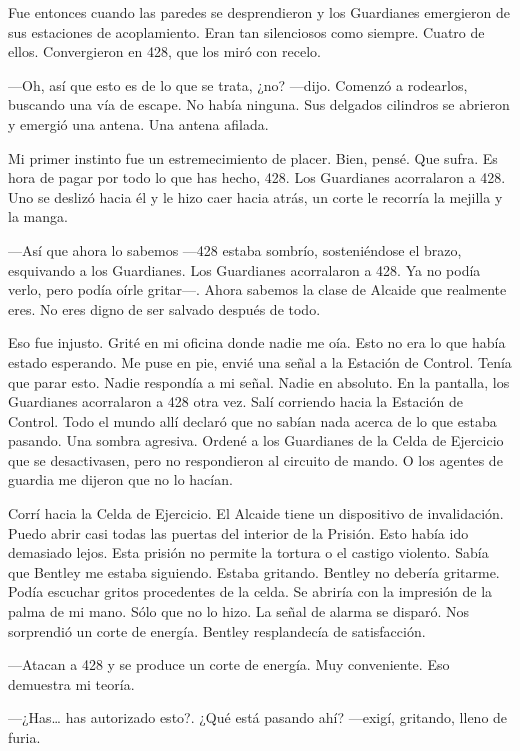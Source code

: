 Fue entonces cuando las paredes se desprendieron y los Guardianes
emergieron de sus estaciones de acoplamiento. Eran tan silenciosos como
siempre. Cuatro de ellos. Convergieron en 428, que los miró con recelo.

---Oh, así que esto es de lo que se trata, ¿no? ---dijo. Comenzó a
rodearlos, buscando una vía de escape. No había ninguna. Sus delgados
cilindros se abrieron y emergió una antena. Una antena afilada.

Mi primer instinto fue un estremecimiento de placer. Bien, pensé. Que
sufra. Es hora de pagar por todo lo que has hecho, 428. Los Guardianes
acorralaron a 428. Uno se deslizó hacia él y le hizo caer hacia atrás,
un corte le recorría la mejilla y la manga.

---Así que ahora lo sabemos ---428 estaba sombrío, sosteniéndose el
brazo, esquivando a los Guardianes. Los Guardianes acorralaron a 428. Ya
no podía verlo, pero podía oírle gritar---. Ahora sabemos la clase de
Alcaide que realmente eres. No eres digno de ser salvado después de
todo.

Eso fue injusto. Grité en mi oficina donde nadie me oía. Esto no era lo
que había estado esperando. Me puse en pie, envié una señal a la
Estación de Control. Tenía que parar esto. Nadie respondía a mi señal.
Nadie en absoluto. En la pantalla, los Guardianes acorralaron a 428 otra
vez. Salí corriendo hacia la Estación de Control. Todo el mundo allí
declaró que no sabían nada acerca de lo que estaba pasando. Una sombra
agresiva. Ordené a los Guardianes de la Celda de Ejercicio que se
desactivasen, pero no respondieron al circuito de mando. O los agentes
de guardia me dijeron que no lo hacían.

Corrí hacia la Celda de Ejercicio. El Alcaide tiene un dispositivo de
invalidación. Puedo abrir casi todas las puertas del interior de la
Prisión. Esto había ido demasiado lejos. Esta prisión no permite la
tortura o el castigo violento. Sabía que Bentley me estaba siguiendo.
Estaba gritando. Bentley no debería gritarme. Podía escuchar gritos
procedentes de la celda. Se abriría con la impresión de la palma de mi
mano. Sólo que no lo hizo. La señal de alarma se disparó. Nos sorprendió
un corte de energía. Bentley resplandecía de satisfacción.

---Atacan a 428 y se produce un corte de energía. Muy conveniente. Eso
demuestra mi teoría.

---¿Has\ldots{} has autorizado esto?. ¿Qué está pasando ahí? ---exigí,
gritando, lleno de furia.

